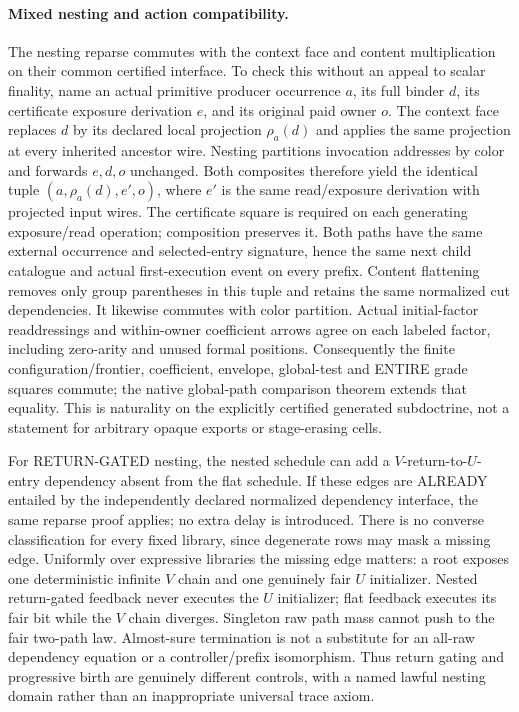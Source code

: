 \documentclass[11pt]{article}
\begin{document}
\paragraph{Mixed nesting and action compatibility.}
The nesting reparse commutes with the context face and content multiplication on their common certified interface. To check this without an appeal to scalar finality, name an actual primitive producer occurrence $a$, its full binder $d$, its certificate exposure derivation $e$, and its original paid owner $o$. The context face replaces $d$ by its declared local projection $\rho_a(d)$ and applies the same projection at every inherited ancestor wire. Nesting partitions invocation addresses by color and forwards $e,d,o$ unchanged. Both composites therefore yield the identical tuple $(a,\rho_a(d),e',o)$, where $e'$ is the same read/exposure derivation with projected input wires. The certificate square is required on each generating exposure/read operation; composition preserves it. Both paths have the same external occurrence and selected-entry signature, hence the same next child catalogue and actual first-execution event on every prefix. Content flattening removes only group parentheses in this tuple and retains the same normalized cut dependencies. It likewise commutes with color partition. Actual initial-factor readdressings and within-owner coefficient arrows agree on each labeled factor, including zero-arity and unused formal positions. Consequently the finite configuration/frontier, coefficient, envelope, global-test and ENTIRE grade squares commute; the native global-path comparison theorem extends that equality. This is naturality on the explicitly certified generated subdoctrine, not a statement for arbitrary opaque exports or stage-erasing cells.

For RETURN-GATED nesting, the nested schedule can add a $V$-return-to-$U$-entry dependency absent from the flat schedule. If these edges are ALREADY entailed by the independently declared normalized dependency interface, the same reparse proof applies; no extra delay is introduced. There is no converse classification for every fixed library, since degenerate rows may mask a missing edge. Uniformly over expressive libraries the missing edge matters: a root exposes one deterministic infinite $V$ chain and one genuinely fair $U$ initializer. Nested return-gated feedback never executes the $U$ initializer; flat feedback executes its fair bit while the $V$ chain diverges. Singleton raw path mass cannot push to the fair two-path law. Almost-sure termination is not a substitute for an all-raw dependency equation or a controller/prefix isomorphism. Thus return gating and progressive birth are genuinely different controls, with a named lawful nesting domain rather than an inappropriate universal trace axiom.
\end{document}
